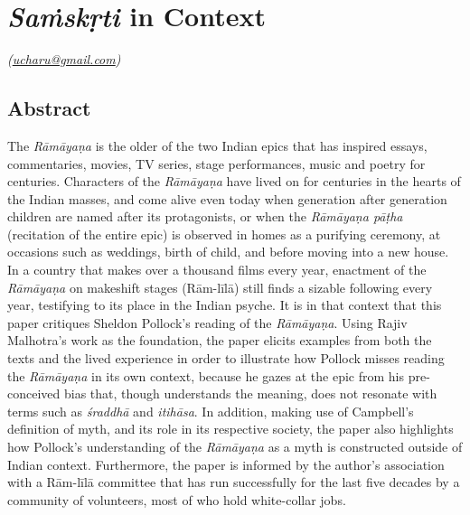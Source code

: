 
\chapter{\textit{Saṁskṛti} in Context}\label{chapter8}


\vskip -3pt

\hfill{\sl(\url{ucharu@gmail.com})}

\section*{Abstract}

The \textit{Rāmāyaṇa} is the older of the two Indian epics that has inspired essays, commentaries, movies, TV series, stage performances, music and poetry for centuries. Characters of the \textit{Rāmāyaṇa} have lived on for centuries in the hearts of the Indian masses, and come alive even today when generation after generation children are named after its protagonists, or when the \textit{Rāmāyaṇa pāṭha} (recitation of the entire epic) is observed in homes as a purifying ceremony, at occasions such as weddings, birth of child, and before moving into a new house. In a country that makes over a thousand films every year, enactment of the \textit{Rāmāyaṇa} on makeshift stages (Rām-līlā) still finds a sizable following every year, testifying to its place in the Indian psyche. It is in that context that this paper critiques Sheldon Pollock’s reading of the \textit{Rāmāyaṇa}. Using Rajiv Malhotra’s work as the foundation, the paper elicits examples from both the texts and the lived experience in order to illustrate how Pollock misses reading the \textit{Rāmāyaṇa} in its own context, because he gazes at the epic from his pre-conceived bias that, though understands the meaning, does not resonate with terms such as \textit{śraddhā} and \textit{itihāsa}. In addition, making use of Campbell’s definition of myth, and its role in its respective society, the paper also highlights how Pollock’s understanding of the \textit{Rāmāyaṇa} as a myth is constructed outside of Indian context. Furthermore, the paper is informed by the author’s association with a Rām-līlā committee that has run successfully for the last five decades by a community of volunteers, most of who hold white-collar jobs.

